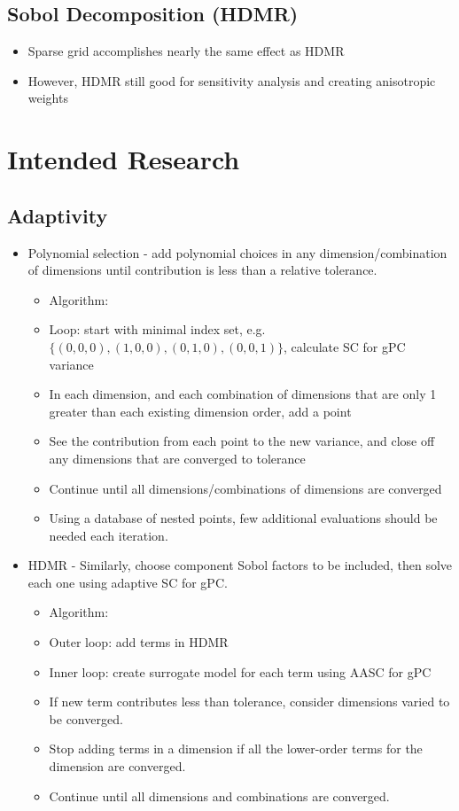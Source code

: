 \documentclass{article}
\begin{document}
\subsection{Sobol Decomposition (HDMR)}
  \begin{itemize}
  \item Sparse grid accomplishes nearly the same effect as HDMR
  \item However, HDMR still good for sensitivity analysis and creating anisotropic weights
  \end{itemize}
  
  \newpage
\section{Intended Research}
\subsection{Adaptivity}
  \begin{itemize}
  \item Polynomial selection - add polynomial choices in any dimension/combination of dimensions until contribution is less than a relative tolerance.
  \begin{itemize}
     \item Algorithm:
     \item Loop: start with minimal index set, e.g. $\{(0,0,0),(1,0,0),(0,1,0),(0,0,1)\}$, calculate SC for gPC variance
     \item In each dimension, and each combination of dimensions that are only 1 greater than each existing dimension order, add a point
     \item See the contribution from each point to the new variance, and close off any dimensions that are converged to tolerance
     \item Continue until all dimensions/combinations of dimensions are converged
     \item Using a database of nested points, few additional evaluations should be needed each iteration.
     \end{itemize}
  \item HDMR - Similarly, choose component Sobol factors to be included, then solve each one using adaptive SC for gPC.
     \begin{itemize}
     \item Algorithm:
     \item Outer loop: add terms in HDMR
     \item Inner loop: create surrogate model for each term using AASC for gPC
     \item If new term contributes less than tolerance, consider dimensions varied to be converged.
     \item Stop adding terms in a dimension if all the lower-order terms for the dimension are converged.
     \item Continue until all dimensions and combinations are converged.
     \end{itemize}
  \end{itemize}
  
\end{document}
